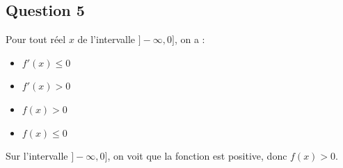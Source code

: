 	\subsection*{Question 5}
	Pour tout réel $x$ de l’intervalle $]-\infty, 0]$, on a :
	
	\begin{itemize}
		\item[a.] $f'(x) \leq 0$
		\item[b.] $f'(x) > 0$
		\item[c.] $f(x) > 0$
		\item[d.] $f(x) \leq 0$
	\end{itemize}
	
	Sur l’intervalle $]-\infty, 0]$, on voit que la fonction est positive, donc $f(x) > 0$.
	\medskip
